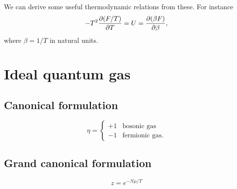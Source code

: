 We can derive some useful thermodynamic relations from these. For
instance
\begin{equation}\label{eq:dfdt}
  -T^2\pdv{(F/T)}{T}=U=\pdv{(\beta F)}{\beta},
\end{equation}
where $\beta=1/T$ in natural units.


\section{Ideal quantum gas}

\subsection{Canonical formulation}

\begin{equation}
\eta=
  \begin{cases}
     +1 & \text{bosonic gas} \\
     -1 & \text{fermionic gas}.
  \end{cases}
\end{equation}

\subsection{Grand canonical formulation}

\begin{equation}\label{eq:fugacity}
  z=e^{-N\mu/T}
\end{equation}

